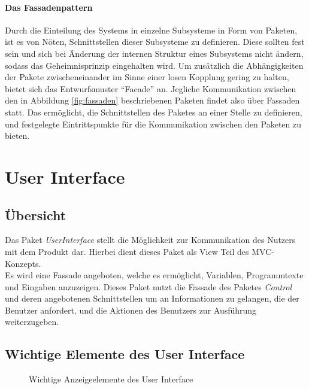 \documentclass[parskip=full]{scrartcl}
\begin{document}
\paragraph{Das Fassadenpattern}
Durch die Einteilung des Systems in einzelne Subsysteme in Form von Paketen, ist es von Nöten, Schnittstellen dieser Subsysteme zu definieren. Diese sollten fest sein und sich bei Änderung der internen Struktur eines Subsystems nicht ändern, sodass das Geheimnisprinzip eingehalten wird. Um zusätzlich die Abhängigkeiten der Pakete zwischeneinander im Sinne einer losen Kopplung gering zu halten, bietet sich das Entwurfsmuster \enquote{Facade} an. Jegliche Kommunikation zwischen den in Abbildung \ref{fig:fassaden} beschriebenen Paketen findet also über Fassaden statt. Das ermöglicht, die Schnittstellen des Paketes an einer Stelle zu definieren, und festgelegte Eintrittspunkte für die Kommunikation zwischen den Paketen zu bieten.


\newpage
\section{User Interface}
\subsection{Übersicht}
Das Paket \textit{UserInterface} stellt die Möglichkeit zur Kommunikation des Nutzers mit dem Produkt dar. Hierbei dient dieses Paket als View Teil des MVC-Konzepts. \\
Es wird eine Fassade angeboten, welche es ermöglicht, Variablen, Programmtexte und Eingaben anzuzeigen. Dieses Paket nutzt die Fassade des Paketes \textit{Control} und deren angebotenen Schnittstellen um an Informationen zu gelangen, die der Benutzer anfordert, und die Aktionen des Benutzers zur Ausführung weiterzugeben.
\subsection{Wichtige Elemente des User Interface}
\begin{figure}[!h]
\centering
\caption{Wichtige Anzeigeelemente des User Interface}
\label{GUIOverview}
\end{figure}
\end{document}
